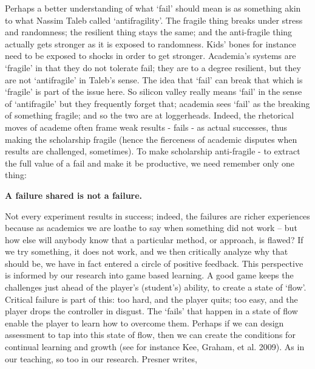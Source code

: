 \documentclass[english,]{book}
\begin{document}
Perhaps a better understanding of what `fail' should mean is as
something akin to what Nassim Taleb called `antifragility'. The fragile
thing breaks under stress and randomness; the resilient thing stays the
same; and the anti-fragile thing actually gets stronger as it is exposed
to randomness. Kids' bones for instance need to be exposed to shocks in
order to get stronger. Academia's systems are `fragile' in that they do
not tolerate fail; they are to a degree resilient, but they are not
`antifragile' in Taleb's sense. The idea that `fail' can break that
which is `fragile' is part of the issue here. So silicon valley really
means `fail' in the sense of `antifragile' but they frequently forget
that; academia sees `fail' as the breaking of something fragile; and so
the two are at loggerheads. Indeed, the rhetorical moves of academe
often frame weak results - fails - as actual successes, thus making the
scholarship fragile (hence the fierceness of academic disputes when
results are challenged, sometimes). To make scholarship anti-fragile -
to extract the full value of a fail and make it be productive, we need
remember only one thing:

\textbf{A failure shared is not a failure.}

Not every experiment results in success; indeed, the failures are richer
experiences because as academics we are loathe to say when something did
not work -- but how else will anybody know that a particular method, or
approach, is flawed? If we try something, it does not work, and we then
critically analyze why that should be, we have in fact entered a circle
of positive feedback. This perspective is informed by our research into
game based learning. A good game keeps the challenges just ahead of the
player's (student's) ability, to create a state of `flow'. Critical
failure is part of this: too hard, and the player quits; too easy, and
the player drops the controller in disgust. The `fails' that happen in a
state of flow enable the player to learn how to overcome them. Perhaps
if we can design assessment to tap into this state of flow, then we can
create the conditions for continual learning and growth (see for
instance Kee, Graham, et al. 2009). As in our teaching, so too in our
research. Presner writes,
\end{document}
